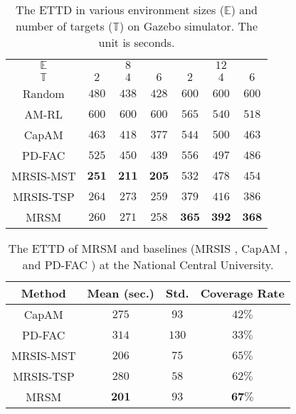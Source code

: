   \begin{table}[h]
    \centering
    \caption{The ETTD in various environment sizes ($\mathit{\mathbb{E}}$) and number of targets ($\mathit{\mathbb{T}}$) on Gazebo simulator. The unit is seconds.}
    \label{tab:ETTD}
    \begin{tabular}{ccccccc}
    \toprule
    $\mathit{\mathbb{E}}$ & \multicolumn{3}{c}{$8$} & \multicolumn{3}{c}{$12$} \\
    \cmidrule(lr){2-4} \cmidrule(lr){5-7}
    $\mathit{\mathbb{T}}$ & $2$ & $4$ & $6$ & $2$ & $4$ & $6$ \\
    \midrule
    Random    & $480$ & $438$ & $428$ & $600$ & $600$ & $600$ \\
    AM-RL     & $600$ & $600$ & $600$ & $565$ & $540$ & $518$ \\
    CapAM     & $463$ & $418$ & $377$ & $544$ & $500$ & $463$ \\
    PD-FAC    & $525$ & $450$ & $439$ & $556$ & $497$ & $486$ \\
    MRSIS-MST & $\mathbf{251}$ & $\mathbf{211}$ & $\mathbf{205}$ & $532$ & $478$ & $454$ \\
    MRSIS-TSP & $264$ & $273$ & $259$ & $379$ & $416$ & $386$ \\
    MRSM      & $260$ & $271$ & $258$ & $\mathbf{365}$ & $\mathbf{392}$ & $\mathbf{368}$ \\
    \bottomrule
    \end{tabular}
    \end{table}


\begin{table}[h]
  \centering
  \caption{The ETTD of MRSM and baselines (MRSIS \cite{li2024mrsis}, CapAM \cite{paull2022learning}, and PD-FAC \cite{sheng2022pd}) at the National Central University.}
  \label{ETTD table in GEB}
  \begin{tabular}{cccc}
  \toprule
  Method         & Mean (sec.) & Std. & Coverage Rate \\
  \midrule
  CapAM          & $275$       & $93$ & $42\%$ \\
  PD-FAC         & $314$       & $130$ & $33\%$ \\
  MRSIS-MST      & $206$       & $75$  & $65\%$ \\
  MRSIS-TSP      & $280$       & $58$  & $62\%$ \\
  MRSM           & $\mathbf{201}$ & $93$  & $\mathbf{67\%}$ \\
  \bottomrule
  \end{tabular}
\end{table}

